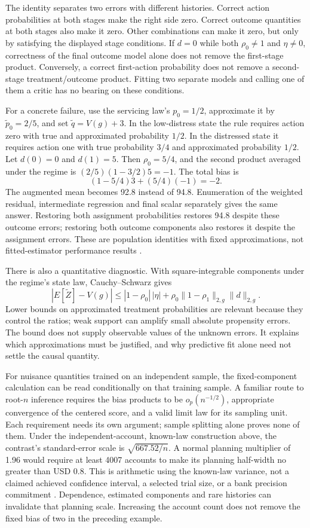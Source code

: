 The identity separates two errors with different histories. Correct action
probabilities at both stages make the right side zero. Correct outcome
quantities at both stages also make it zero. Other combinations can make it
zero, but only by satisfying the displayed stage conditions. If $d=0$ while
both $\rho_0\neq1$ and $\eta\neq0$, correctness of the final outcome model
alone does not remove the first-stage product. Conversely, a correct
first-action probability does not remove a second-stage treatment/outcome
product. Fitting two separate models and calling one of them a critic has no
bearing on these conditions.

For a concrete failure, use the servicing law's $p_0=1/2$, approximate it by
$\widetilde p_0=2/5$, and set $\widetilde q=V(g)+3$. In the low-distress
state the rule requires action zero with true and approximated probability
$1/2$. In the distressed state it requires action one with true probability
$3/4$ and approximated probability $1/2$. Let $d(0)=0$ and $d(1)=5$.
Then $\rho_0=5/4$, and the second product averaged under the regime is
$(2/5)(1-3/2)5=-1$. The total bias is
\[
 (1-5/4)3+(5/4)(-1)=-2.
\]
The augmented mean becomes 92.8 instead of 94.8. Enumeration of the weighted
residual, intermediate regression and final scalar separately gives the same
answer. Restoring both assignment probabilities restores 94.8 despite these
outcome errors; restoring both outcome components also restores it despite
the assignment errors. These are population identities with fixed
approximations, not fitted-estimator performance results
\citep{exec14_workflow_remainder}.

There is also a quantitative diagnostic. With square-integrable components
under the regime's state law, Cauchy--Schwarz gives
\[
 |E[\widetilde Z]-V(g)|
 \leq |1-\rho_0|\,|\eta|
 +\rho_0\|1-\rho_1\|_{2,g}\|d\|_{2,g}.
\]
Lower bounds on approximated treatment probabilities are relevant because
they control the ratios; weak support can amplify small absolute propensity
errors. The bound does not supply observable values of the unknown errors.
It explains which approximations must be justified, and why predictive fit
alone need not settle the causal quantity.

For nuisance quantities trained on an independent sample, the fixed-component
calculation can be read conditionally on that training sample. A familiar
route to root-$n$ inference requires the bias products to be
$o_p(n^{-1/2})$, appropriate convergence of the centered score, and a valid
limit law for its sampling unit. Each requirement needs its own argument;
sample splitting alone proves none of them. Under the independent-account,
known-law construction above, the contrast's standard-error scale is
$\sqrt{667.52/n}$. A normal planning multiplier of 1.96 would require at
least 4007 accounts to make its planning half-width no greater than USD 0.8.
This is arithmetic using the known-law variance, not a claimed achieved
confidence interval, a selected trial size, or a bank precision commitment
\citep{exec14_workflow_remainder}. Dependence, estimated components and rare
histories can invalidate that planning scale. Increasing the account count
does not remove the fixed bias of two in the preceding example.

